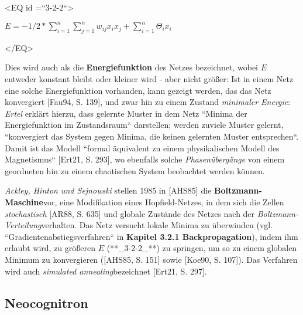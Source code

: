 <EQ id =``3-2-2``>

$E = -1/2 * \sum^n_{i=1}\sum^n_{j=1} w_{ij}x_ix_j + \sum^n_{i=1}\Theta_ix_i$

</EQ>

Dies wird auch als die \textbf{Energiefunktion} des Netzes bezeichnet, wobei $E$ entweder konstant bleibt oder kleiner wird - aber nicht größer: Ist in einem Netz eine solche Energiefunktion vorhanden, kann gezeigt werden, das das Netz konvergiert [Fau94, S. 139], und zwar hin zu einem Zustand \textit{minimaler Energie}: \textit{Ertel} erklärt hierzu, dass gelernte Muster in dem Netz ``Minima der Energiefunktion im Zustandsraum`` darstellen; werden zuviele Muster gelernt, ``konvergiert das System gegen Minima, die keinen gelernten Muster entsprechen``. Damit ist das Modell ``formal äquivalent zu einem physikalischen Modell des Magnetismus`` [Ert21, S. 293]\footnotemark[27], wo ebenfalls solche \textit{Phasenübergänge} von einem geordneten hin zu einem chaotischen System beobachtet werden können\footnotemark[28].

\textit{Ackley, Hinton und Sejnowski} stellen 1985 in [AHS85] die \textbf{Boltzmann-Maschine}\footnotemark[29] vor, eine Modifikation eines Hopfield-Netzes, in dem sich die Zellen \textit{stochastisch} [AR88, S. 635] und globale Zustände des Netzes nach der \textit{Boltzmann-Verteilung}\footnotemark[30] verhalten. Das Netz versucht lokale Minima zu überwinden (vgl. ``Gradientenabstiegsverfahren`` in \textbf{Kapitel 3.2.1 Backpropagation}), indem ihm erlaubt wird, zu größeren $E$ (**_3-2-2_**) zu springen, um so zu einem globalen Minimum zu konvergieren ([AHS85, S. 151] sowie [Koe90, S. 107]). Das Verfahren wird auch \textit{simulated annealing}\footnotemark[31] bezeichnet [Ert21, S. 297].


\subsection{Neocognitron}

